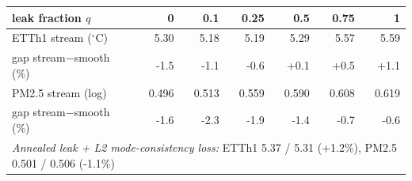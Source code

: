 \begin{tabular}{lrrrrrr}
\toprule
leak fraction $q$ & 0 & 0.1 & 0.25 & 0.5 & 0.75 & 1 \\
\midrule
ETTh1 stream ($^\circ$C) & 5.30 & 5.18 & 5.19 & 5.29 & 5.57 & 5.59 \\
\quad gap stream$-$smooth (\%) & -1.5 & -1.1 & -0.6 & +0.1 & +0.5 & +1.1 \\
PM2.5 stream (log) & 0.496 & 0.513 & 0.559 & 0.590 & 0.608 & 0.619 \\
\quad gap stream$-$smooth (\%) & -1.6 & -2.3 & -1.9 & -1.4 & -0.7 & -0.6 \\
\midrule
\multicolumn{7}{l}{\emph{Annealed leak + L2 mode-consistency loss:} ETTh1 5.37 / 5.31 (+1.2\%), PM2.5 0.501 / 0.506 (-1.1\%)} \\
\bottomrule
\end{tabular}
